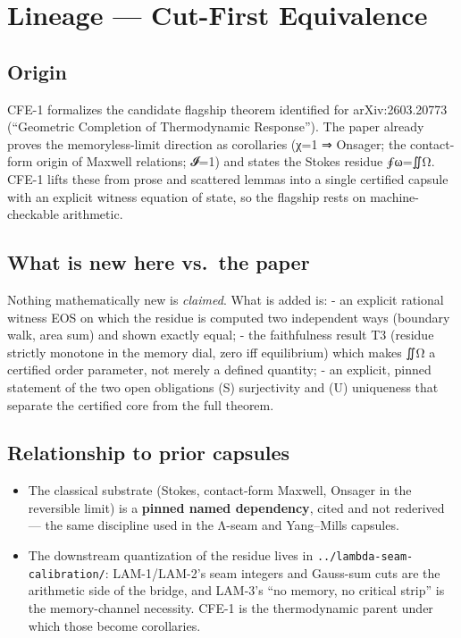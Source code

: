 \hypertarget{lineage-cut-first-equivalence}{%
\chapter{Lineage --- Cut-First Equivalence}\label{lineage-cut-first-equivalence}}

\hypertarget{origin}{%
\section{Origin}\label{origin}}

CFE-1 formalizes the candidate flagship theorem identified for
arXiv:2603.20773 (``Geometric Completion of Thermodynamic Response'').
The paper already proves the memoryless-limit direction as corollaries
(χ=1 ⇒ Onsager; the contact-form origin of Maxwell relations; 𝓘=1) and
states the Stokes residue ∮ω=∬Ω. CFE-1 lifts these from prose and
scattered lemmas into a single certified capsule with an explicit
witness equation of state, so the flagship rests on machine-checkable
arithmetic.

\hypertarget{what-is-new-here-vs.-the-paper}{%
\section{What is new here vs.~the paper}\label{what-is-new-here-vs.-the-paper}}

Nothing mathematically new is \emph{claimed}. What is added is:
- an explicit rational witness EOS on which the residue is computed two
independent ways (boundary walk, area sum) and shown exactly equal;
- the faithfulness result T3 (residue strictly monotone in the memory
dial, zero iff equilibrium) which makes ∬Ω a certified order
parameter, not merely a defined quantity;
- an explicit, pinned statement of the two open obligations (S)
surjectivity and (U) uniqueness that separate the certified core from
the full theorem.

\hypertarget{relationship-to-prior-capsules}{%
\section{Relationship to prior capsules}\label{relationship-to-prior-capsules}}

\begin{itemize}
\tightlist
\item
  The classical substrate (Stokes, contact-form Maxwell, Onsager in the
  reversible limit) is a \textbf{pinned named dependency}, cited and not
  rederived --- the same discipline used in the Λ-seam and Yang--Mills
  capsules.
\item
  The downstream quantization of the residue lives in
  \texttt{../lambda-seam-calibration/}: LAM-1/LAM-2's seam integers and
  Gauss-sum cuts are the arithmetic side of the bridge, and LAM-3's
  ``no memory, no critical strip'' is the memory-channel necessity. CFE-1
  is the thermodynamic parent under which those become corollaries.
\end{itemize}

